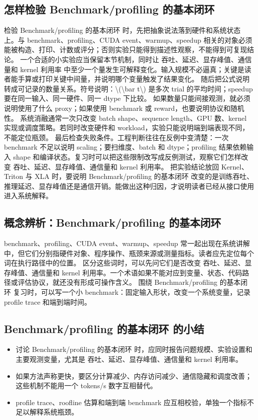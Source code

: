 \documentclass[a4paper]{article}
\begin{document}
\subsection{怎样检验 Benchmark/profiling 的基本闭环}
检验 Benchmark/profiling 的基本闭环 时，先把抽象说法落到硬件和系统状态上。与 benchmark、profiling、CUDA event、warmup、speedup 相关的对象必须能被构造、打印、计数或评分；否则实验只能得到描述性观察，不能得到可复现结论。
一个合适的小实验应当保留本节机制，同时让 吞吐、延迟、显存峰值、通信量和 kernel 利用率 中至少一个量发生可解释变化。输入规模不必逼真；关键是读者能手算或打印关键中间量，并说明哪个变量触发了结果变化。
随后把公式说明转成可记录的数量关系。符号说明：\textbackslash{}(\textbackslash{}bar t\textbackslash{}) 是多次 trial 的平均时间；speedup 要在同一输入、同一硬件、同一 dtype 下比较。 如果数量只能间接观测，就必须说明使用了什么 proxy；如果使用 benchmark 或 reward，也要说明协议和随机性。
系统消融通常一次只改变 batch shape、sequence length、GPU 数、kernel 实现或调度策略。若同时改变硬件和 workload，实验只能说明端到端表现不同，不能定位瓶颈。
最后检查失败条件。工程判断往往在反例中变清楚：一次 benchmark 不足以说明 scaling；要扫维度、batch 和 dtype；profiling 结果依赖输入 shape 和编译状态。复习时可以把这些限制改写成反例测试，观察它们怎样改变 吞吐、延迟、显存峰值、通信量和 kernel 利用率。
把实验结论放回 Kernel、Triton 与 XLA 时，要说明 Benchmark/profiling 的基本闭环 改变的是训练吞吐、推理延迟、显存峰值还是通信开销。能做出这种归因，才说明读者已经从接口使用进入系统解释。
\subsection{概念辨析：Benchmark/profiling 的基本闭环}
benchmark、profiling、CUDA event、warmup、speedup 常一起出现在系统讲解中，但它们分别指硬件对象、程序操作、瓶颈来源或测量指标。读者应先定位每个词在执行路径中的位置。
区分这些词时，可以先问它们是否改变 吞吐、延迟、显存峰值、通信量和 kernel 利用率。一个术语如果不能对应到变量、状态、代码路径或评估协议，就还没有形成可操作含义。
围绕 Benchmark/profiling 的基本闭环 复习时，可以写一个小 benchmark：固定输入形状，改变一个系统变量，记录 profile trace 和端到端时间。
\subsection{Benchmark/profiling 的基本闭环 的小结}
\begin{itemize}
\item 讨论 Benchmark/profiling 的基本闭环 时，应同时报告问题规模、实验设置和主要观测变量，尤其是 吞吐、延迟、显存峰值、通信量和 kernel 利用率。
\item 如果方法声称更快，要区分计算减少、内存访问减少、通信隐藏和调度改善；这些机制不能用一个 tokens/s 数字互相替代。
\item profile trace、roofline 估算和端到端 benchmark 应互相校验，单独一个指标不足以解释系统瓶颈。
\end{itemize}
\end{document}
